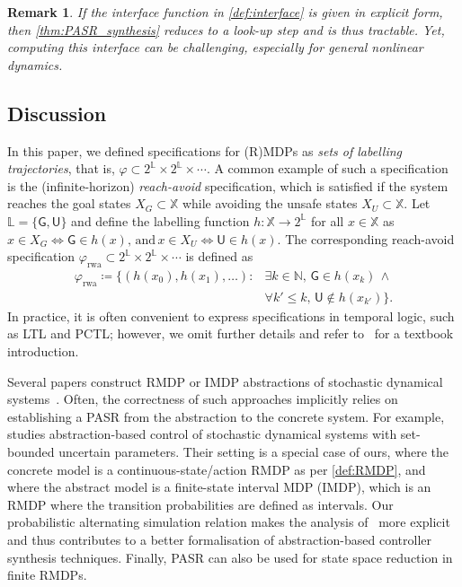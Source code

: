 \documentclass[letterpaper, 10 pt, conference]{ieeeconf}  %
\newtheorem{remark}{Remark}
\newcommand*{\States}{\ensuremath{\mathbb{X}}}
\newcommand*{\Labels}{\ensuremath{\mathbb{L}}}
\newcommand*{\labelfunc}{\ensuremath{h}}
\newcommand*{\NN}{\mathbb{N}}
\begin{document}
\begin{remark}
    If the interface function in \cref{def:interface} is given in explicit form, then \cref{thm:PASR_synthesis} reduces to a look-up step and is thus tractable.
    Yet, computing this interface can be challenging, especially for general nonlinear dynamics.
\end{remark}

\subsection{Discussion}
In this paper, we defined specifications for (R)MDPs as \emph{sets of labelling trajectories}, that is, $\varphi \subset 2^\Labels \times 2^\Labels \times \cdots$.
A common example of such a specification is the (infinite-horizon) \emph{reach-avoid} specification, which is satisfied if the system reaches the goal states $X_G \subset \States$ while avoiding the unsafe states $X_U \subset \States$.
Let $\Labels = \{ \mathsf{G}, \mathsf{U} \}$ and define the labelling function $\labelfunc \colon \States \to 2^\Labels$ for all $x \in \States$ as
$
   x \in X_G \iff \mathsf{G} \in \labelfunc(x),
    \,\text{and}\,
   x \in X_U \iff \mathsf{U} \in \labelfunc(x).
$
The corresponding reach-avoid specification $\varphi_\text{rwa} \subset 2^\Labels \times 2^\Labels \times \cdots$ is defined as
\begin{align*}\label{equ:RwA}
    \varphi_\text{rwa} \coloneqq \big\{ 
   (\labelfunc(x_0), \labelfunc(x_1), \ldots) : {}&{}\exists k \in \NN, \, \mathsf{G} \in \labelfunc(x_k) \, \wedge
    \\
    &\forall k'\leq k, \, \mathsf{U} \notin \labelfunc(x_{k'})
    \big\}.
\end{align*}
In practice, it is often convenient to express specifications in temporal logic, such as LTL and PCTL; however, we omit further details and refer to~\cite{BaierKatoen08} for a textbook introduction.

Several papers construct RMDP or IMDP abstractions of stochastic dynamical systems~\cite{DBLP:journals/jair/BadingsRAPPSJ23,DBLP:journals/tac/LahijanianAB15,DBLP:conf/hybrid/CauchiLLAKC19,DBLP:conf/l4dc/GraciaBLL24,DBLP:journals/corr/abs-2404-08344}.
Often, the correctness of such approaches implicitly relies on establishing a PASR from the abstraction to the concrete system.
For example,~\cite{DBLP:conf/aaai/BadingsRA023} studies abstraction-based control of stochastic dynamical systems with set-bounded uncertain parameters.
Their setting is a special case of ours, where the concrete model is a continuous-state/action RMDP as per \cref{def:RMDP}, and where the abstract model is a finite-state interval MDP (IMDP), which is an RMDP where the transition probabilities are defined as intervals.
Our probabilistic alternating simulation relation makes the analysis of~\cite{DBLP:conf/aaai/BadingsRA023} more explicit and thus contributes to a better formalisation of abstraction-based controller synthesis techniques.
Finally, PASR can also be used for state space reduction in finite RMDPs.
\end{document}
